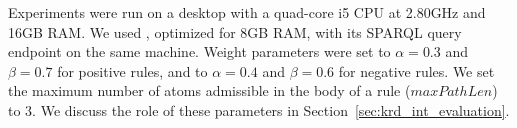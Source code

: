 Experiments were run on a desktop with a quad-core i5 CPU at 2.80GHz and 16GB RAM. We used , optimized for 8GB RAM, with its SPARQL query endpoint on the same machine.
Weight parameters %
were set to  $\alpha=0.3$ and $\beta=0.7$ for positive rules, and to $\alpha=0.4$ and $\beta=0.6$ for negative rules. 
We set the maximum number of atoms 
admissible in the body of a rule ($maxPathLen$) to $3$.
We discuss the role of these parameters in Section~\ref{sec:krd_int_evaluation}. 

